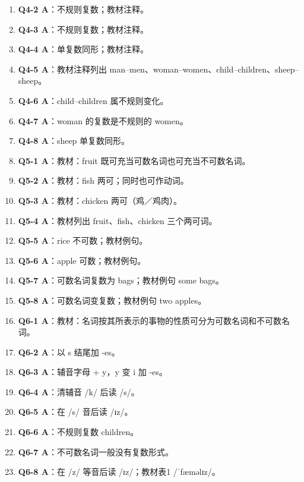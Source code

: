 \documentclass[11pt,a4paper]{ctexart}
\begin{document}
\begin{enumerate}[leftmargin=1.6em,itemsep=2pt]
\item \textbf{Q4-2 A}：不规则复数；教材注释。
\item \textbf{Q4-3 A}：不规则复数；教材注释。
\item \textbf{Q4-4 A}：单复数同形；教材注释。
\item \textbf{Q4-5 A}：教材注释列出 man–men、woman–women、child–children、sheep–sheep。
\item \textbf{Q4-6 A}：child–children 属不规则变化。
\item \textbf{Q4-7 A}：woman 的复数是不规则的 women。
\item \textbf{Q4-8 A}：sheep 单复数同形。
\item \textbf{Q5-1 A}：教材：fruit 既可充当可数名词也可充当不可数名词。
\item \textbf{Q5-2 A}：教材：fish 两可；同时也可作动词。
\item \textbf{Q5-3 A}：教材：chicken 两可（鸡／鸡肉）。
\item \textbf{Q5-4 A}：教材列出 fruit、fish、chicken 三个两可词。
\item \textbf{Q5-5 A}：rice 不可数；教材例句。
\item \textbf{Q5-6 A}：apple 可数；教材例句。
\item \textbf{Q5-7 A}：可数名词复数为 bags；教材例句 some bags。
\item \textbf{Q5-8 A}：可数名词变复数；教材例句 two apples。
\item \textbf{Q6-1 A}：教材：名词按其所表示的事物的性质可分为可数名词和不可数名词。
\item \textbf{Q6-2 A}：以 s 结尾加 -es。
\item \textbf{Q6-3 A}：辅音字母 + y，y 变 i 加 -es。
\item \textbf{Q6-4 A}：清辅音 /k/ 后读 /s/。
\item \textbf{Q6-5 A}：在 /s/ 音后读 /ɪz/。
\item \textbf{Q6-6 A}：不规则复数 children。
\item \textbf{Q6-7 A}：不可数名词一般没有复数形式。
\item \textbf{Q6-8 A}：在 /z/ 等音后读 /ɪz/；教材表1 /ˈfæməlɪz/。
\end{enumerate}
\end{document}
